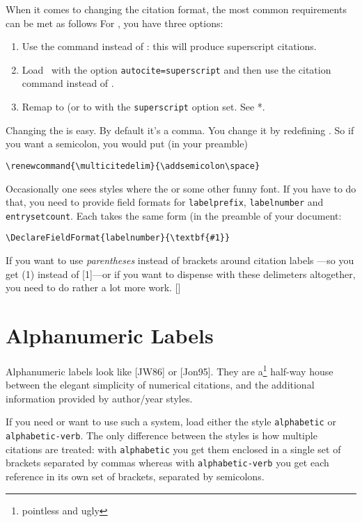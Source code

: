 When it comes to changing the citation format, the most common
requirements can be met as follows
For , you have three options:
\begin{enumerate}
\item Use the  command instead of : this will
  produce superscript citations.
\item Load \biblatex\ with the option \verb|autocite=superscript| and
  then use the  citation command instead of .
\item Remap  to  (or to  with the
  \verb|superscript| option set. See *.
\end{enumerate}

Changing the  is
easy. By default it's a comma. You change it by redefining
. So if you want a semicolon, you would put (in
your preamble)
\begin{center}
\verb|\renewcommand{\multicitedelim}{\addsemicolon\space}|
\end{center}

Occasionally one sees styles where the  or some other
funny font. If you have to do that, you need to provide field formats
for \verb|labelprefix|, \verb|labelnumber| and
\verb|entrysetcount|. Each takes the same form (in the preamble of
your document:
\begin{center}
\verb|\DeclareFieldFormat{labelnumber}{\textbf{#1}}|
\end{center}


If you want to use \emph{parentheses} instead of brackets around citation labels
---so you get (1) instead of [1]---or if you want to dispense with
these delimeters altogether, you need to do rather a lot more
work. []

\section{Alphanumeric Labels}

Alphanumeric labels look like [JW86] or [Jon95]. They are a\footnote{pointless and ugly} half-way house between the elegant
simplicity of numerical citations, and the additional information
provided by author/year styles.

If you need or want to use such a system, load either the style
\verb|alphabetic| or \verb|alphabetic-verb|. The only difference
between the styles is how multiple citations are treated: with
\verb|alphabetic| you get them enclosed in a single set of
brackets
separated by commas
whereas with \verb|alphabetic-verb| you get each reference in its own
set of brackets, separated by semicolons.

